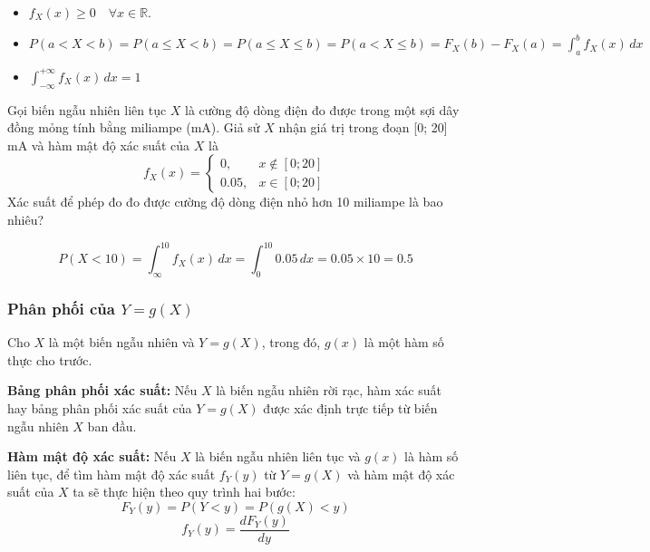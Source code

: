 \documentclass[12pt,a4paper]{article}
\begin{document}
\begin{tinhchat}[title={Tính chất của hàm mật độ}]
  \begin{itemize}
    \item $f_X(x) \ge 0 \quad \forall x \in \mathbb{R}$.
    \item $P(a < X < b) = P(a \le X < b) = P(a \le X \le b) = P(a < X \le b) = F_X(b) - F_X(a) = \displaystyle\int_a^b f_X(x)\,dx$
    \item $\displaystyle\int_{-\infty}^{+\infty} f_X(x)\,dx = 1$
  \end{itemize}
\end{tinhchat}

\begin{vidu}[title={Hàm mật độ của biến ngẫu nhiên}]
Gọi biến ngẫu nhiên liên tục $X$ là cường độ dòng điện đo được trong một sợi dây đồng mỏng tính bằng miliampe (mA). Giả sử $X$ nhận giá trị trong đoạn [0; 20] mA và hàm mật độ xác suất của $X$ là
  \[
    f_X(x) = \begin{cases}
      0, & x \notin [0; 20] \\
      0.05, & x \in [0; 20]
    \end{cases}
  \]  
  Xác suất để phép đo đo được cường độ dòng điện nhỏ hơn 10 miliampe là bao nhiêu?

  \[
    P(X < 10) = \displaystyle\int_{\infty}^{10} f_X(x)\,dx = \displaystyle\int_{0}^{10} 0.05\,dx = 0.05 \times 10 = 0.5
  \]
\end{vidu}


\subsubsection{Phân phối của $Y = g(X)$}

\begin{phuongphap}
  Cho $X$ là một biến ngẫu nhiên và $Y = g(X)$, trong đó, $g(x)$ là một hàm số thực cho trước.
  
  \textbf{Bảng phân phối xác suất:} Nếu $X$ là biến ngẫu nhiên rời rạc, hàm xác suất hay bảng phân phối xác suất của $Y = g(X)$ được xác định trực tiếp từ biến ngẫu nhiên $X$ ban đầu.
  
  \textbf{Hàm mật độ xác suất:} Nếu $X$ là biến ngẫu nhiên liên tục và $g(x)$ là hàm số liên tục, để tìm hàm mật độ xác suất $f_Y(y)$ từ $Y = g(X)$ và hàm mật độ xác suất của $X$ ta sẽ thực hiện theo quy trình hai bước:
  \[
    F_Y(y) = P(Y < y) = P(g(X) < y)
  \]
  \[
    f_Y(y) = \dfrac{dF_Y(y)}{dy}
  \]
\end{phuongphap}
\end{document}
